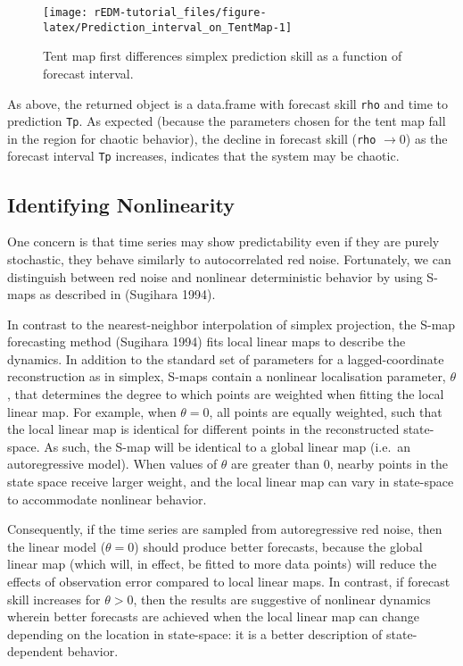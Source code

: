 \documentclass[]{article}
\begin{document}
\begin{figure}[h]

{\centering \texttt{[image: rEDM-tutorial\_files/figure-latex/Prediction\_interval\_on\_TentMap-1]} 

}

\caption{Tent map first differences simplex prediction skill as a function of forecast interval.}\label{fig:Prediction_interval_on_TentMap}
\end{figure}

As above, the returned object is a data.frame with forecast skill
\texttt{rho} and time to prediction \texttt{Tp}. As expected (because
the parameters chosen for the tent map fall in the region for chaotic
behavior), the decline in forecast skill (\texttt{rho}
\(\rightarrow 0\)) as the forecast interval \texttt{Tp} increases,
indicates that the system may be chaotic.

\hypertarget{identifying-nonlinearity}{%
\subsection{Identifying Nonlinearity}\label{identifying-nonlinearity}}

One concern is that time series may show predictability even if they are
purely stochastic, they behave similarly to autocorrelated red noise.
Fortunately, we can distinguish between red noise and nonlinear
deterministic behavior by using S-maps as described in (Sugihara 1994).

In contrast to the nearest-neighbor interpolation of simplex projection,
the S-map forecasting method (Sugihara 1994) fits local linear maps to
describe the dynamics. In addition to the standard set of parameters for
a lagged-coordinate reconstruction as in simplex, S-maps contain a
nonlinear localisation parameter, \(\theta\), that determines the degree
to which points are weighted when fitting the local linear map. For
example, when \(\theta = 0\), all points are equally weighted, such that
the local linear map is identical for different points in the
reconstructed state-space. As such, the S-map will be identical to a
global linear map (i.e.~an autoregressive model). When values of
\(\theta\) are greater than \(0\), nearby points in the state space
receive larger weight, and the local linear map can vary in state-space
to accommodate nonlinear behavior.

Consequently, if the time series are sampled from autoregressive red
noise, then the linear model (\(\theta = 0\)) should produce better
forecasts, because the global linear map (which will, in effect, be
fitted to more data points) will reduce the effects of observation error
compared to local linear maps. In contrast, if forecast skill increases
for \(\theta > 0\), then the results are suggestive of nonlinear
dynamics wherein better forecasts are achieved when the local linear map
can change depending on the location in state-space: it is a better
description of state-dependent behavior.
\end{document}
